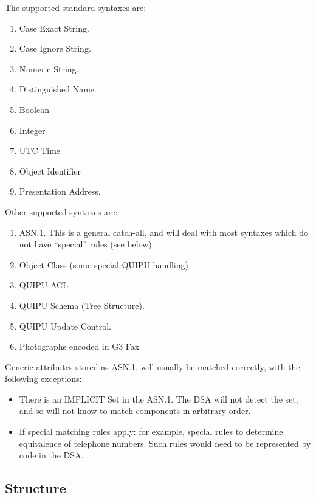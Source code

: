 The supported standard syntaxes are:

\begin {enumerate}
\item Case Exact String.
\item Case Ignore String.
\item Numeric String.
\item Distinguished Name.
\item Boolean
\item Integer
\item UTC Time
\item Object Identifier
\item Presentation Address. 
\end {enumerate}

Other supported syntaxes are: 

\begin {enumerate}
\item ASN.1.  This is a general catch-all, and will deal with most syntaxes
which do not have ``special'' rules (see below).
\item Object Class (some special QUIPU handling)
\item QUIPU ACL
\item QUIPU Schema (Tree Structure).
\item QUIPU Update Control.
\item Photographs encoded in G3 Fax
\end {enumerate}

Generic attributes stored as ASN.1, will usually be matched correctly, with
the following exceptions:

\begin {itemize}
\item
There is an IMPLICIT Set in the ASN.1.  The DSA will not detect the
set, and so will not know to match components in arbitrary order.

\item
If special matching rules apply: for example, special rules to
determine equivalence of telephone numbers.  Such rules would need
to be represented by code in the DSA.
\end {itemize}

\subsection {Structure}

